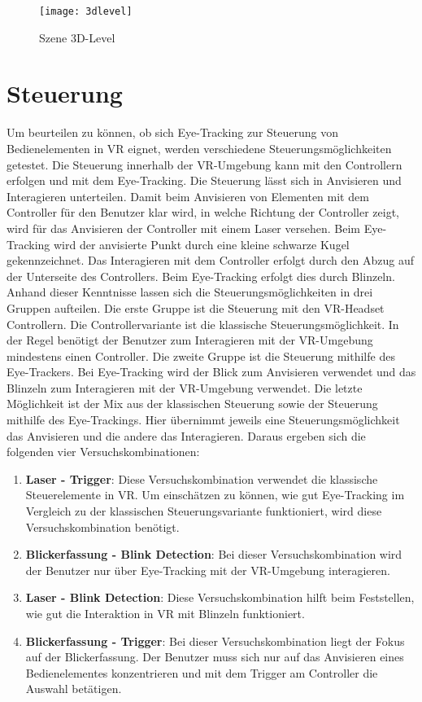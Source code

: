 \begin{figure}[!htbp]
	\centering
	\texttt{[image: 3dlevel]}
	\caption[Szene 3D-Level]{Szene 3D-Level}
	\label{fig:3D-Level}
\end{figure}

\section{Steuerung}
Um beurteilen zu können, ob sich Eye-Tracking zur Steuerung von Bedienelementen in \ac{VR} eignet, werden verschiedene Steuerungsmöglichkeiten getestet. Die Steuerung innerhalb der \ac{VR}-Umgebung kann mit den Controllern erfolgen und mit dem Eye-Tracking. Die Steuerung lässt sich in Anvisieren und Interagieren unterteilen. Damit beim Anvisieren von Elementen mit dem Controller für den Benutzer klar wird, in welche Richtung der Controller zeigt, wird für das Anvisieren der Controller mit einem Laser versehen. Beim Eye-Tracking wird der anvisierte Punkt durch eine kleine schwarze Kugel gekennzeichnet. Das Interagieren mit dem Controller erfolgt durch den Abzug auf der Unterseite des Controllers. Beim Eye-Tracking erfolgt dies durch Blinzeln.\\
Anhand dieser Kenntnisse lassen sich die Steuerungsmöglichkeiten in drei Gruppen aufteilen. Die erste Gruppe ist die Steuerung mit den \ac{VR}-Headset Controllern. Die Controllervariante ist die klassische Steuerungsmöglichkeit. In der Regel benötigt der Benutzer zum Interagieren mit der \ac{VR}-Umgebung mindestens einen Controller. Die zweite Gruppe ist die Steuerung mithilfe des Eye-Trackers. Bei Eye-Tracking wird der Blick zum Anvisieren verwendet und das Blinzeln zum Interagieren mit der \ac{VR}-Umgebung verwendet. Die letzte Möglichkeit ist der Mix aus der klassischen Steuerung sowie der Steuerung mithilfe des Eye-Trackings. Hier übernimmt jeweils eine Steuerungsmöglichkeit das Anvisieren und die andere das Interagieren. Daraus ergeben sich die folgenden vier Versuchskombinationen:

\begin{enumerate}
	\item \textbf{Laser - Trigger}: Diese Versuchskombination verwendet die klassische Steuerelemente in \ac{VR}. Um einschätzen zu können, wie gut Eye-Tracking im Vergleich zu der klassischen Steuerungsvariante funktioniert, wird diese Versuchskombination benötigt. 
	\item \textbf{Blickerfassung - Blink Detection}: Bei dieser Versuchskombination wird der Benutzer nur über Eye-Tracking mit der \ac{VR}-Umgebung interagieren. 
	\item \textbf{Laser - Blink Detection}: Diese Versuchskombination hilft beim Feststellen, wie gut die Interaktion in \ac{VR} mit Blinzeln funktioniert. 
	\item \textbf{Blickerfassung - Trigger}: Bei dieser Versuchskombination liegt der Fokus auf der Blickerfassung. Der Benutzer muss sich nur auf das Anvisieren eines Bedienelementes konzentrieren und mit dem Trigger am Controller die Auswahl betätigen.
\end{enumerate}

